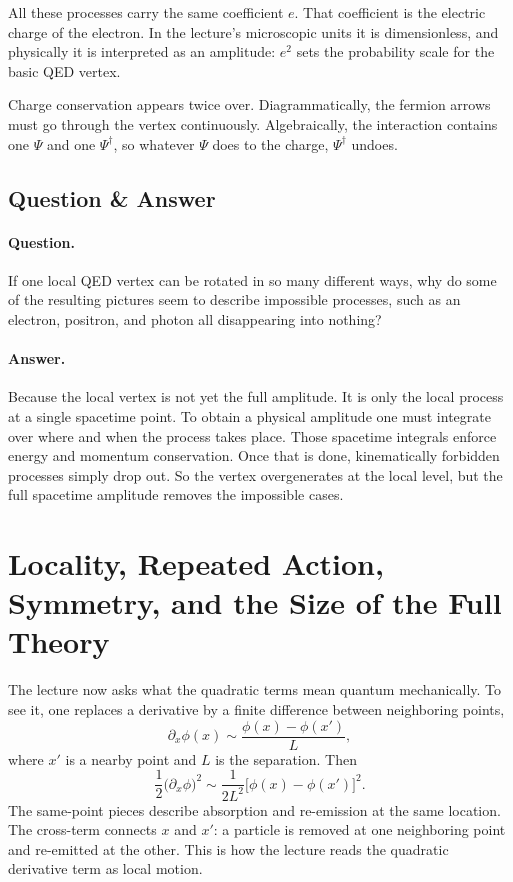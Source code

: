 All these processes carry the same coefficient \(e\). That coefficient is the electric charge of the electron. In the lecture's microscopic units it is dimensionless, and physically it is interpreted as an amplitude: \(e^2\) sets the probability scale for the basic QED vertex.

Charge conservation appears twice over. Diagrammatically, the fermion arrows must go through the vertex continuously. Algebraically, the interaction contains one \(\Psi\) and one \(\Psi^\dagger\), so whatever \(\Psi\) does to the charge, \(\Psi^\dagger\) undoes.

\subsection{Question \& Answer}

\paragraph{Question.}
If one local QED vertex can be rotated in so many different ways, why do some of the resulting pictures seem to describe impossible processes, such as an electron, positron, and photon all disappearing into nothing?

\paragraph{Answer.}
Because the local vertex is not yet the full amplitude. It is only the local process at a single spacetime point. To obtain a physical amplitude one must integrate over where and when the process takes place. Those spacetime integrals enforce energy and momentum conservation. Once that is done, kinematically forbidden processes simply drop out. So the vertex overgenerates at the local level, but the full spacetime amplitude removes the impossible cases.

\section{Locality, Repeated Action, Symmetry, and the Size of the Full Theory}

The lecture now asks what the quadratic terms mean quantum mechanically. To see it, one replaces a derivative by a finite difference between neighboring points,
\begin{equation}
\partial_x\phi(x)\sim \frac{\phi(x)-\phi(x')}{L},
\end{equation}
where \(x'\) is a nearby point and \(L\) is the separation. Then
\begin{equation}
\frac12\bigl(\partial_x\phi\bigr)^2
\sim
\frac{1}{2L^2}\bigl[\phi(x)-\phi(x')\bigr]^2.
\end{equation}
The same-point pieces describe absorption and re-emission at the same location. The cross-term connects \(x\) and \(x'\): a particle is removed at one neighboring point and re-emitted at the other. This is how the lecture reads the quadratic derivative term as local motion.

